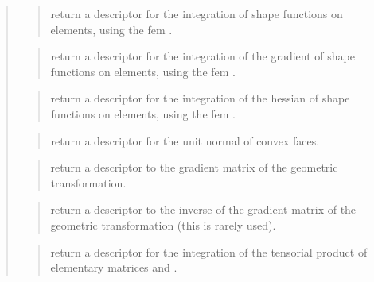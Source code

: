 \documentclass[a4paper,11pt,english]{sphinxmanual}
\begin{document}
\sphinxAtStartPar
{}
\begin{quote}

\sphinxAtStartPar
{}
\begin{quote}

\sphinxAtStartPar
return a descriptor for the integration of shape functions on
elements, using the fem .
\end{quote}

\sphinxAtStartPar
{}
\begin{quote}

\sphinxAtStartPar
return a descriptor for the integration of the gradient of shape
functions on elements, using the fem .
\end{quote}

\sphinxAtStartPar
{}
\begin{quote}

\sphinxAtStartPar
return a descriptor for the integration of the hessian of shape
functions on elements, using the fem .
\end{quote}

\sphinxAtStartPar
{}
\begin{quote}

\sphinxAtStartPar
return a descriptor for the unit normal of convex faces.
\end{quote}

\sphinxAtStartPar
{}
\begin{quote}

\sphinxAtStartPar
return a descriptor to the gradient matrix of the geometric
transformation.
\end{quote}

\sphinxAtStartPar
{}
\begin{quote}

\sphinxAtStartPar
return a descriptor to the inverse of the gradient matrix of the
geometric transformation (this is rarely used).
\end{quote}

\sphinxAtStartPar
{}
\begin{quote}

\sphinxAtStartPar
return a descriptor for the integration of the tensorial product of
elementary matrices  and .
\end{quote}
\end{quote}
\end{document}
